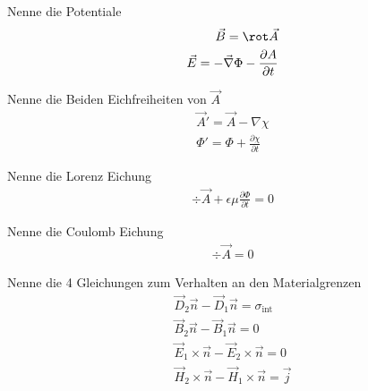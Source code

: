 \documentclass[a7paper,11pt,print,grid=front]{kartei}
\begin{document}
	\begin{karte}{Nenne die Potentiale}
		\begin{eqnarray*}
			\vec B = \rot \vec A \\
			\vec E = - \vec \nabla \Phi - \frac{\partial A}{\partial t}
		\end{eqnarray*}
	\end{karte}
	
	\begin{karte}{Nenne die Beiden Eichfreiheiten von $\vec A$}
		\begin{eqnarray*}
			\vec A' = \vec A - \nabla \chi \\
			\Phi' = \Phi + \frac{\partial \chi}{\partial t}
		\end{eqnarray*}
	\end{karte}
	
	
	\begin{karte}{Nenne die Lorenz Eichung}
		\begin{eqnarray*}
			\div \vec A + \epsilon \mu \frac{\partial \Phi}{\partial t} = 0
		\end{eqnarray*}
	\end{karte}
	
	\begin{karte}{Nenne die Coulomb Eichung}
		\begin{eqnarray*}
			\div \vec A = 0
		\end{eqnarray*}
	\end{karte}
	
	\begin{karte}[Potentialtheorie]{Nenne die 4 Gleichungen zum Verhalten an den Materialgrenzen}
		\begin{eqnarray*}
			\vec D_2 \vec n - \vec D_1 \vec n = \sigma_{\text{int}} \\
			\vec B_2 \vec n - \vec B_1 \vec n = 0 \\
			\vec E_1 \times \vec n - \vec E_2 \times \vec n = 0 \\
			\vec H_2 \times \vec n - \vec H_1 \times \vec n = \vec j
		\end{eqnarray*}
	\end{karte}
	

 
\end{document}
